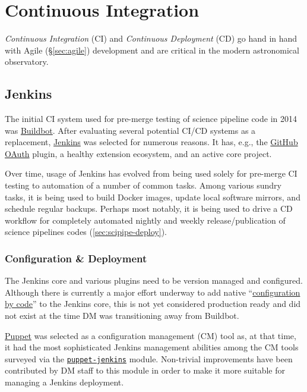 \section{Continuous Integration}

\emph{Continuous Integration} (CI) and \emph{Continuous Deployment} (CD) go hand in hand with Agile (\S\ref{sec:agile}) development  and  are  critical in the  modern astronomical observatory.\cite{2014arXiv1407.6463E}

\subsection{Jenkins}
\label{sec:jenkins}

 The initial CI system used for pre-merge testing of science pipeline code in 2014  was \href{https://buildbot.net/}{Buildbot}.
After evaluating several potential CI/CD systems as a replacement,
\href{https://jenkins.io/}{Jenkins} was selected for numerous reasons.
It has, e.g.,  the \href{https://plugins.jenkins.io/github-oauth}{GitHub OAuth} plugin,
a healthy extension ecosystem, and an active core project.

Over time, usage of Jenkins has evolved from being used solely for pre-merge
CI testing to automation of a number of common tasks.  Among various sundry
tasks, it is being used to build Docker images, update local software mirrors, and
schedule regular backups.  Perhaps most notably, it is being used to drive a
CD workflow for completely automated nightly and weekly
release/publication of science pipelines codes (\ref{sec:scipipe-deploy}).

\subsubsection{Configuration \& Deployment}

The Jenkins core and various plugins need to be version managed and configured.
Although there is currently a major effort underway to add native
``\href{https://github.com/jenkinsci/configuration-as-code-plugin}{configuration by code}'' to
the Jenkins core, this is not yet considered production ready and did not exist
at the time DM was transitioning away from Buildbot.

\href{https://puppet.com/}{Puppet} was selected as a configuration management (CM) tool as, at that time, it had the most sophisticated Jenkins
management abilities among the CM tools surveyed via the \href{https://github.com/voxpupuli/puppet-jenkins}{\texttt{puppet-jenkins}} module.
Non-trivial improvements have been contributed by DM staff to this module\cite{puppetconf-jenkins} in order to make it more suitable for managing a Jenkins deployment.

